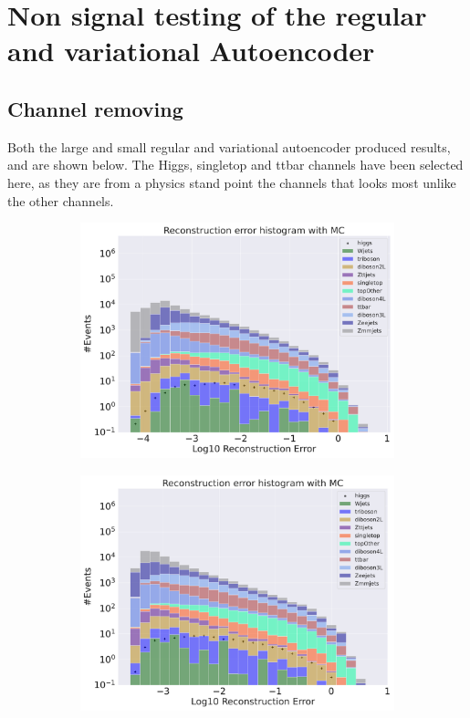 \section{Non signal testing of the regular and variational Autoencoder}

\subsection*{Channel removing}

Both the large and small regular and variational autoencoder produced results, and are shown below. The Higgs, singletop and ttbar channels have been selected here, as they are 
from a physics stand point the channels that looks most unlike the other channels.  


\begin{figure}[H]
    \centering
    \begin{subfigure}{.45\textwidth}
        \includegraphics[width=\textwidth]{Figures/AE_testing/small/b_data_recon_big_rm3_feats_sig_higgs.pdf}
        \caption{}
        \label{fig:ae_small_higgs}
    \end{subfigure}
    \hfill 
    \begin{subfigure}{.45\textwidth}
        \includegraphics[width=\textwidth]{Figures/AE_testing/big/b_data_recon_big_rm3_feats_sig_higgs.pdf}

\end{subfigure}
\end{figure}
